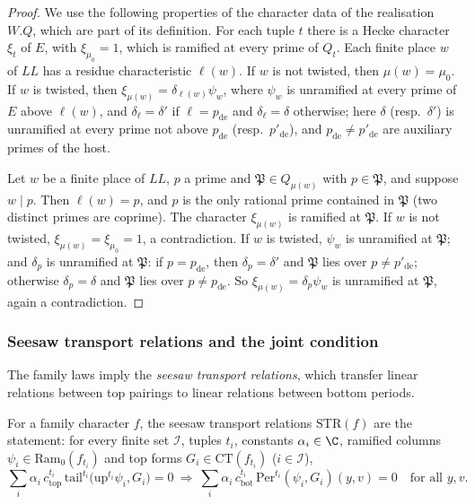 \begin{proof}
We use the following properties of the character data of the realisation $W.Q$, which are part of its definition.
For each tuple $t$ there is a Hecke character $\xi_t$ of $E$, with $\xi_{\mu_0}=1$, which is ramified at every prime of
$Q_t$. Each finite place $w$ of $\mathit{LL}$ has a residue characteristic $\ell(w)$. If $w$ is not twisted, then
$\mu(w)=\mu_0$. If $w$ is twisted, then $\xi_{\mu(w)}=\delta_{\ell(w)}\psi_w$, where $\psi_w$ is unramified at every
prime of $E$ above $\ell(w)$, and $\delta_\ell=\delta'$ if $\ell=p_{\mathrm{de}}$ and $\delta_\ell=\delta$ otherwise;
here $\delta$ (resp.\ $\delta'$) is unramified at every prime not above $p_{\mathrm{de}}$ (resp.\ $p'_{\mathrm{de}}$),
and $p_{\mathrm{de}}\ne p'_{\mathrm{de}}$ are auxiliary primes of the host.

Let $w$ be a finite place of $\mathit{LL}$, $p$ a prime and $\mathfrak P\in Q_{\mu(w)}$ with $p\in\mathfrak P$, and
suppose $w\mid p$. Then $\ell(w)=p$, and $p$ is the only rational prime contained in $\mathfrak P$ (two distinct primes
are coprime). The character $\xi_{\mu(w)}$ is ramified at $\mathfrak P$. If $w$ is not twisted,
$\xi_{\mu(w)}=\xi_{\mu_0}=1$, a contradiction. If $w$ is twisted, $\psi_w$ is unramified at $\mathfrak P$; and
$\delta_p$ is unramified at $\mathfrak P$: if $p=p_{\mathrm{de}}$, then $\delta_p=\delta'$ and $\mathfrak P$ lies over
$p\ne p'_{\mathrm{de}}$; otherwise $\delta_p=\delta$ and $\mathfrak P$ lies over $p\ne p_{\mathrm{de}}$. So
$\xi_{\mu(w)}=\delta_p\psi_w$ is unramified at $\mathfrak P$, again a contradiction.
\end{proof}

\subsubsection{Seesaw transport relations and the joint condition}
The family laws imply the \emph{seesaw transport relations}, which transfer linear relations between top pairings to
linear relations between bottom periods.

\begin{definition}\label{pf:open0a:def:mainx}
For a family character $f$, the seesaw transport relations $\mathrm{STR}(f)$ are the statement: for every finite set
$\mathcal I$, tuples $t_i$, constants $\alpha_i\in\C$, ramified columns $\psi_i\in\mathrm{Ram}_0(f_{t_i})$ and top forms
$G_i\in\mathrm{CT}(f_{t_i})$ ($i\in\mathcal I$),
\[
\sum_{i}\alpha_i\,c_{\mathrm{top}}^{t_i}\,\mathrm{tail}^{t_i}\bigl(\mathrm{up}^{t_i}\psi_i,G_i\bigr)=0
\ \Longrightarrow\
\sum_i\alpha_i\,c_{\mathrm{bot}}^{t_i}\,\mathrm{Per}^{t_i}(\psi_i,G_i)(y,v)=0\quad\text{for all }y,v.
\]
\end{definition}

